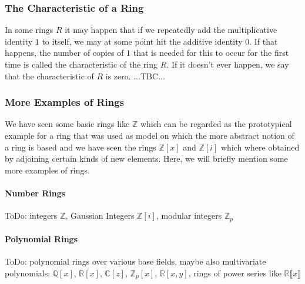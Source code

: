 % 


\subsubsection{The Characteristic of a Ring}
In some rings $R$ it may happen that if we repeatedly add the multiplicative identity $1$ to itself, we may at some point hit the additive identity $0$. If that happens, the number of copies of $1$ that is needed for this to occur for the first time is called the characteristic of the ring $R$. If it doesn't ever happen, we say that the characteristic of $R$ is zero. ...TBC...




\subsubsection{More Examples of Rings}
We have seen some basic rings like $\mathbb{Z}$ which can be regarded as the prototypical example for a ring that was used as model on which the more abstract notion of a ring is based and we have seen the rings $\mathbb{Z}[x]$ and $\mathbb{Z}[i]$ which where obtained by adjoining certain kinds of new elements. Here, we will briefly mention some more examples of rings.

\paragraph{Number Rings}
ToDo: integers $\mathbb{Z}$, Gaussian Integers $\mathbb{Z}[i]$, modular integers $\mathbb{Z}_p$

\paragraph{Polynomial Rings}
ToDo: polynomial rings over various base fields, maybe also multivariate polynomials: $\mathbb{Q}[x]$, $\mathbb{R}[x]$, $\mathbb{C}[z]$, $\mathbb{Z}_p[x]$, $\mathbb{R}[x,y]$, rings of power series like
$\mathbb{R} \llbracket x \rrbracket$

